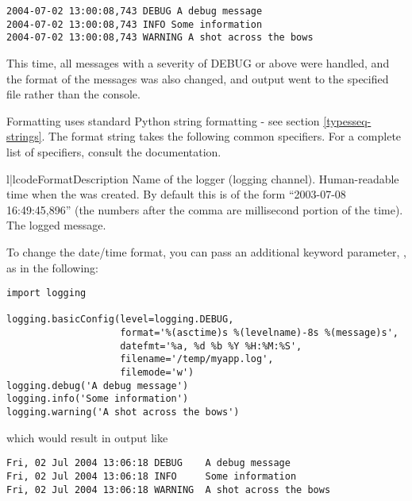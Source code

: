 \begin{verbatim}
2004-07-02 13:00:08,743 DEBUG A debug message
2004-07-02 13:00:08,743 INFO Some information
2004-07-02 13:00:08,743 WARNING A shot across the bows
\end{verbatim}

This time, all messages with a severity of DEBUG or above were handled,
and the format of the messages was also changed, and output went to the
specified file rather than the console.

Formatting uses standard Python string formatting - see section
\ref{typesseq-strings}. The format string takes the following
common specifiers. For a complete list of specifiers, consult the
 documentation.

\begin{tableii}{l|l}{code}{Format}{Description}
     {Name of the logger (logging channel).}
  {Human-readable time when the 
                        was created.  By default this is of the form
                        ``2003-07-08 16:49:45,896'' (the numbers after the
                        comma are millisecond portion of the time).}
  {The logged message.}
\end{tableii}

To change the date/time format, you can pass an additional keyword parameter,
, as in the following:

\begin{verbatim}
import logging

logging.basicConfig(level=logging.DEBUG,
                    format='%(asctime)s %(levelname)-8s %(message)s',
                    datefmt='%a, %d %b %Y %H:%M:%S',
                    filename='/temp/myapp.log',
                    filemode='w')
logging.debug('A debug message')
logging.info('Some information')
logging.warning('A shot across the bows')
\end{verbatim}

which would result in output like

\begin{verbatim}
Fri, 02 Jul 2004 13:06:18 DEBUG    A debug message
Fri, 02 Jul 2004 13:06:18 INFO     Some information
Fri, 02 Jul 2004 13:06:18 WARNING  A shot across the bows
\end{verbatim}

